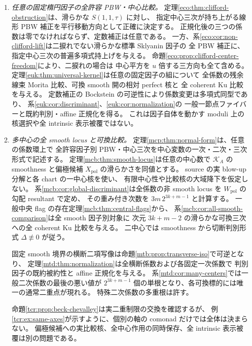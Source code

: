 \begin{enumerate}
 \item \emph{任意の固定楕円因子の全許容 PBW・中心比較。}
 定理\ref{eco:thm:clifford-obstruction}は、滑らかな $S(1,1,\tau)$ に対し、
 指定中心三次が持ち上がる線形 PBW 補正を平行移動方向として正確に決定する。
 正規化後の三つの係数は零でなければならず、定数補正は任意である。
 一方、系\ref{eco:cor:non-clifford-lift}は二捩れでない滑らかな標準 Sklyanin 因子の
 全 PBW 補正に、指定中心三次の普遍多項式持上げを与える。
 命題\ref{eco:prop:clifford-center-freedom}により、二捩れの場合は
 中心平方を $u$ 倍する三方向も全て含める。
 定理\ref{euk:thm:universal-kernel}は任意の固定因子の組について
 全係数の残余線束 Morita 比較、可換 smooth 開の相対 perfect 核と
 全 coherent Ku 比較を与える。
 定数補正の Bockstein の可逆性により係数変更は多項式同型であり、
 系\ref{euk:cor:discriminant}、\ref{euk:cor:normalization}の
 一般一節点ファイバーと既約判別・affine 正規化を得る。
 これは因子自体を動かす moduli 上の核選択や全 intrinsic 表示被覆ではない。

 \item \emph{多中心の全 smooth locus と可換比較。}
 定理\ref{mcp:thm:normal-form}は、任意の係数環上で
 全許容因子別 PBW・中心三次を中心変数の一次・二次・三次形式で記述する。
 定理\ref{mcb:thm:smooth-locus}は任意の中心数で
 $\mathcal K_A$ の smoothness と偏極候補 $X_{\mathrm{pol}}$ の滑らかさを同値とする。
 source の実 blow-up 分解と各 chart の一中心核を使い、
 有限中心性や比較核の大域降下を仮定しない。
 系\ref{mcb:cor:global-discriminant}は全係数の非 smooth locus を
 $W_{\mathrm{pol}}$ の勾配 resultant で定め、
 その重み付き次数を $3m\,2^{3k+m-1}$ と計算する。
 一般中央 flag の存在定理\ref{mcb:thm:central-flags}から、
 系\ref{mcb:cor:all-smooth-comparison}は全 smooth 因子別対象に
 次元 $3k+m-2$ の滑らかな可換三次への全 coherent Ku 比較を与える。
 二中心では smoothness から切断判別形式 $\Delta\not\equiv0$ が従う。

 固定 smooth 境界の横断二項写像は命題\ref{mtb:prop:transverse-iso}で可逆となり、
 定理\ref{mtd:thm:normalization}は全横断係数および各固定一次係数で
 判別因子の既約被約性と affine 正規化を与える。
 系\ref{mtd:cor:many-centers}では一般二次係数の最後の悪い値が
 $2^{3k+m-1}$ 個の単根となり、各可換標的には唯一の通常二重点が現れる。
 特殊二次係数の多重根は許す。

 命題\ref{tcr:prop:beck-chevalley}は実二重制限の交換を確認するが、
 例\ref{tcr:ex:same-axes}が示すように、個別の軸の comonad だけでは全体は決まらない。
 偏極候補への実比較核、全中心作用の同時保存、全 intrinsic 表示被覆は別の問題である。


\end{enumerate}
